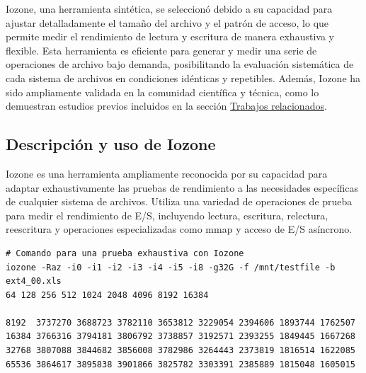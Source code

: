Iozone, una herramienta sintética, se seleccionó debido a su capacidad para ajustar detalladamente el tamaño del archivo y el patrón de acceso, lo que permite medir el rendimiento de lectura y escritura de manera exhaustiva y flexible. Esta herramienta es eficiente para generar y medir una serie de operaciones de archivo bajo demanda, posibilitando la evaluación sistemática de cada sistema de archivos en condiciones idénticas y repetibles. Además, Iozone ha sido ampliamente validada en la comunidad científica y técnica, como lo demuestran estudios previos incluidos en la sección \hyperref[sec:trabajos relacionados]{Trabajos relacionados}.

\subsection{Descripción y uso de Iozone}

Iozone es una herramienta ampliamente reconocida por su capacidad para adaptar exhaustivamente las pruebas de rendimiento a las necesidades específicas de cualquier sistema de archivos. Utiliza una variedad de operaciones de prueba para medir el rendimiento de E/S, incluyendo lectura, escritura, relectura, reescritura y operaciones especializadas como mmap y acceso de E/S asíncrono.\\

\begin{tcolorbox}[title=Código de ejemplo para Iozone, fonttitle=\bfseries, colback=gray!5!white, colframe=gray!75!black]
\begin{footnotesize}
\begin{verbatim}
# Comando para una prueba exhaustiva con Iozone
iozone -Raz -i0 -i1 -i2 -i3 -i4 -i5 -i8 -g32G -f /mnt/testfile -b ext4_00.xls
64 128 256 512 1024 2048 4096 8192 16384

8192  3737270 3688723 3782110 3653812 3229054 2394606 1893744 1762507
16384 3766316 3794181 3806792 3738857 3192571 2393255 1849445 1667268
32768 3807088 3844682 3856008 3782986 3264443 2373819 1816514 1622085
65536 3864617 3895838 3901866 3825782 3303391 2385889 1815048 1605015
\end{verbatim}
\end{footnotesize}
\end{tcolorbox}

